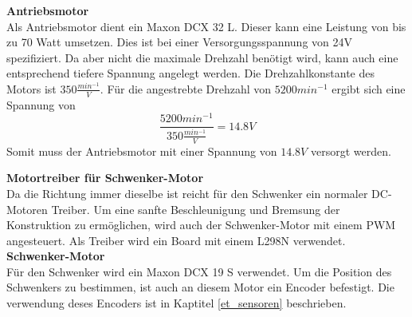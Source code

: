 \documentclass[../../main.tex]{subfiles}
\begin{document}
    \textbf{Antriebsmotor}\\
    Als Antriebsmotor dient ein Maxon DCX 32 L. Dieser kann eine Leistung von bis zu 70 Watt umsetzen. \cite{MaxonDCX32L} Dies ist bei einer Versorgungsspannung von 24V spezifiziert. Da aber nicht die maximale Drehzahl benötigt wird, kann auch eine entsprechend tiefere Spannung angelegt werden. Die Drehzahlkonstante des Motors ist $350 \frac{min^{-1}}{V}$. Für die angestrebte Drehzahl von $5200min^{-1}$ ergibt sich eine Spannung von $$\frac{5200min^{-1}}{350 \frac{min^{-1}}{V}} =14.8V$$ Somit muss der Antriebsmotor mit einer Spannung von $14.8V$ versorgt werden.\\\textbf{\color{red}{TODO:korrekt verwendete Spannung einsetzen!}}

    \textbf{Motortreiber für Schwenker-Motor}\\
    Da die Richtung immer dieselbe ist reicht für den Schwenker ein normaler DC-Motoren Treiber. Um eine sanfte Beschleunigung und Bremsung der Konstruktion zu ermöglichen, wird auch der Schwenker-Motor mit einem PWM angesteuert. Als Treiber wird ein Board mit einem L298N verwendet.\\

    \textbf{Schwenker-Motor}\\
    Für den Schwenker wird ein Maxon DCX 19 S verwendet. Um die Position des Schwenkers zu bestimmen, ist auch an diesem Motor ein Encoder befestigt. Die verwendung deses Encoders ist in Kaptitel \ref{et_sensoren} beschrieben. \cite{MaxonDCX19S}\\

    
\end{document}
